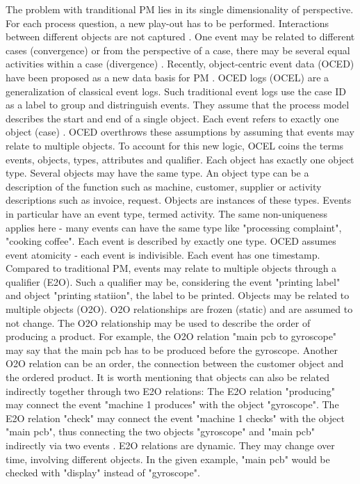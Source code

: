 The problem with tranditional PM lies in its single dimensionality of perspective. For each process question, a new play-out has to be performed. Interactions between different objects are not captured \parencite{van2023object}. One event may be related to different cases (convergence) or from the perspective of a case, there may be several equal activities within a case (divergence) \parencite{van2019object}.
Recently, object-centric event data (OCED) have been proposed as a new data basis for PM \parencite{van2019object}. OCED logs (OCEL) are a generalization of classical event logs. Such traditional event logs use the case ID as a label to group and distringuish events. They assume that the process model describes the start and end of a single object. Each event refers to exactly one object (case) \parencite{van2023object}. OCED overthrows these assumptions by assuming that events may relate to multiple objects. To account for this new logic, OCEL coins the terms events, objects, types, attributes and qualifier. Each object has exactly one object type. Several objects may have the same type. An object type can be a description of the function such as machine, customer, supplier or activity descriptions such as invoice, request. Objects are instances of these types. Events in particular have an event type, termed activity. The same non-uniqueness applies here - many events can have the same type like "processing complaint", "cooking coffee". Each event is described by exactly one type. OCED assumes event atomicity - each event is indivisible. Each event has one timestamp. Compared to traditional PM, events may relate to multiple objects through a qualifier (E2O). Such a qualifier may be, considering the event "printing label" and object "printing statiion", the label to be printed. Objects may be related to multiple objects (O2O). O2O relationships are frozen (static) and are assumed to not change. The O2O relationship may be used to describe the order of producing a product. For example, the O2O relation "main pcb to gyroscope" may say that the main pcb has to be produced before the gyroscope. Another O2O relation can be an order, the connection between the customer object and the ordered product. It is worth mentioning that objects can also be related indirectly together through two E2O relations: The E2O relation "producing" may connect the event "machine 1 produces" with the object "gyroscope". The E2O relation "check" may connect the event "machine 1 checks" with the object "main pcb", thus connecting the two objects "gyroscope" and "main pcb" indirectly via two events \parencite{van2019object}. E2O relations are dynamic. They may change over time, involving different objects. In the given example, "main pcb" would be checked with "display" instead of "gyroscope".


